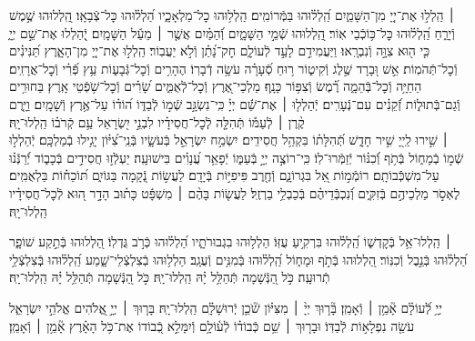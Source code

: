 \documentclass[twoside, openany, parskip=half, 11pt]{book}
\begin{document}
 ׀
הַֽלְל֣וּ אֶת־יְיָ֭ מִן־הַשָּׁמַ֑יִם הַֽ֝לְל֗וּהוּ בַּמְּֿרוֹמִֽים׃
הַֽלְל֥וּהוּ כׇל־מַלְאָכָ֑יו הַ֝לְל֗וּהוּ כׇּל־צְֿבָאָֽו׃
הַֽ֭לְלוּהוּ שֶׁ֣מֶשׁ וְֿיָרֵ֑חַ הַֽ֝לְל֗וּהוּ כׇּל־כּ֥וֹכְֿבֵי אֽוֹר׃
הַֽ֭לְלוּהוּ שְֿׁמֵ֣י הַשָּׁמָ֑יִם וְֿ֝הַמַּ֗יִם אֲשֶׁ֤ר ׀ מֵעַ֬ל הַשָּׁמָֽיִם׃
יְֽֿ֭הַלְלוּ אֶת־שֵׁ֣ם יְיָ֑ כִּ֤י ה֖וּא צִוָּ֣ה וְֿנִבְרָֽאוּ׃
וַיַּעֲמִידֵ֣ם לָעַ֣ד לְֿעוֹלָ֑ם חׇק־נָ֝תַ֗ן וְֿלֹ֣א יַעֲבֽוֹר׃
הַֽלְל֣וּ אֶת־יְיָ֭ מִן־הָאָ֑רֶץ תַּ֝נִּינִ֗ים וְֿכׇל־תְּֿהֹמֽוֹת׃
אֵ֣שׁ וּ֭בָרָד שֶׁ֣לֶג וְֿקִיט֑וֹר ר֥וּחַ סְֿ֝עָרָ֗ה עֹשָׂ֥ה דְֿבָרֽוֹ׃
הֶהָרִ֥ים וְֿכׇל־גְּֿבָע֑וֹת עֵ֥ץ פְּֿ֝רִ֗י וְֿכׇל־אֲרָזִֽים׃
הַחַיָּ֥ה וְֿכׇל־בְּֿהֵמָ֑ה רֶ֗֝מֶשׂ וְֿצִפּ֥וֹר כָּנָֽף׃
מַלְכֵי־אֶ֭רֶץ וְֿכׇל־לְֿאֻמִּ֑ים שָׂ֝רִ֗ים וְֿכׇל־שֹׁ֥פְֿטֵי אָֽרֶץ׃
בַּחוּרִ֥ים וְֿגַם־בְּֿתוּל֑וֹת זְֿ֝קֵנִ֗ים עִם־נְֿעָרִֽים׃
יְֿהַלְל֤וּ ׀ אֶת־שֵׁ֬ם יְיָ֗ כִּֽי־נִשְׂגָּ֣ב שְֿׁמ֣וֹ לְֿבַדּ֑וֹ
ה֝וֹד֗וֹ עַל־אֶ֥רֶץ וְֿשָׁמָֽיִם׃ וַיָּ֤רֶם קֶ֨רֶן ׀ לְֿעַמּ֡וֹ תְּֿהִלָּ֤ה לְֽֿכׇל־חֲסִידָ֗יו
לִבְנֵ֣י יִ֭שְׂרָאֵל עַ֥ם קְֿרֹב֗וֹ הַֽלְלוּ־יָֽהּ׃\\
 ׀ 
שִׁ֣ירוּ לַֽייָ֭ שִׁ֣יר חָדָ֑שׁ  תְּֿ֝הִלָּת֗וֹ בִּקְהַ֥ל חֲסִידִֽים׃ 
יִשְׂמַ֣ח יִשְׂרָאֵ֣ל בְּֿעֹשָׂ֑יו  בְּֿנֵֽי־צִ֝יּ֗וֹן יָגִ֥ילוּ בְֿמַלְכָּֽם׃ 
יְֿהַלְל֣וּ שְֿׁמ֣וֹ בְֿמָח֑וֹל  בְּֿתֹ֥ף וְֿ֝כִנּ֗וֹר יְֿזַמְּֿרוּ־לֽוֹ׃ 
כִּֽי־רוֹצֶ֣ה יְיָ֣ בְּֿעַמּ֑וֹ יְֿפָאֵ֥ר עֲ֝נָוִ֗ים בִּישׁוּעָֽה׃ 
יַעְלְֿז֣וּ חֲסִידִ֣ים בְּֿכָב֑וֹד יְֿ֝רַנְּֿנ֗וּ עַל־מִשְׁכְּֿֿבוֹתָֽם׃
רוֹמְֿמ֣וֹת אֵ֭ל בִּגְרוֹנָ֑ם וְֿחֶ֖רֶב פִּיפִיּ֣וֹת בְּֿיָדָֽם׃
לַעֲשׂ֣וֹת נְֿ֭קָמָה בַּגּוֹיִ֑ם תּ֝וֹכֵח֗וֹת בַּלְאֻמִּֽים׃
לֶאְסֹ֣ר מַלְכֵיהֶ֣ם בְּֿזִקִּ֑ים וְֿ֝נִכְבְּֿֿדֵיהֶ֗ם בְּֿכַבְלֵ֥י בַרְזֶֽל׃
לַעֲשׂ֤וֹת בָּהֶ֨ם ׀ מִשְׁפָּ֬ט כָּת֗וּב הָדָ֣ר ה֭וּא לְֿכׇל־חֲסִידָ֗יו הַֽלְלוּ־יָֽהּ׃ 

 ׀ \hfill \break
הַֽלְלוּ־אֵ֥ל בְּֿקׇדְשׁ֑וֹ  הַֽ֝לְל֗וּהוּ בִּרְקִ֥יעַ עֻזּֽוֹ׃
הַלְל֥וּהוּ בִגְבוּרֹתָ֑יו הַ֝לְל֗וּהוּ כְּֿרֹ֣ב גֻּדְלֽוֹ׃
הַ֭לְלוּהוּ בְּֿתֵ֣קַע שׁוֹפָ֑ר הַ֝לְל֗וּהוּ בְּֿנֵ֣בֶל וְֿכִנּֽוֹר׃
הַ֭לְלוּהוּ בְּֿתֹ֣ף וּמָח֑וֹל הַֽ֝לְל֗וּהוּ בְּֿמִנִּ֥ים וְֿעֻגָֽב׃
הַלְל֥וּהוּ בְֿצִלְצְֿלֵי־שָׁ֑מַע הַֽ֝לְל֗וּהוּ בְּֽֿצִלְצְֿלֵ֥י תְֿרוּעָֽה׃
כֹּ֣ל הַ֭נְּֿשָׁמָה תְּֿהַלֵּ֥ל יָ֗הּ הַֽלְלוּ־יָֽהּ׃
\scriptsize{כֹּ֣ל הַ֭נְּֿשָׁמָה תְּֿהַלֵּ֥ל יָ֗הּ הַֽלְלוּ־יָֽהּ׃ \\}
\normalsize{}

\negline

יְיָ֥ לְֿ֝עוֹלָ֗ם אָ֘מֵ֥ן ׀ וְֿאָמֵֽן׃ \hfill \break
{}בָּ֘ר֤וּךְ יְיָ֨ ׀ מִצִּיּ֗וֹן שֹׁ֘כֵ֤ן יְֽֿרוּשָׁלָ֗‍ִם הַֽלְלוּ־יָֽהּ׃ \hfill \break
{}בָּר֤וּךְ ׀ יְיָ֣ אֱ֭לֹהִים אֱלֹהֵ֣י יִשְׂרָאֵ֑ל עֹשֵׂ֖ה נִפְלָא֣וֹת לְֿבַדּֽוֹ׃ \hfill \break
וּבָר֤וּךְ ׀ שֵׁ֥ם כְּֿבוֹד֗וֹ לְֿע֫וֹלָ֥ם וְֿיִמָּלֵ֣א כְֿ֭בוֹדוֹ אֶת־כֹּ֥ל הָאָ֗רֶץ אָ֘מֵ֥ן ׀ וְֿאָמֵֽן׃
\end{document}
